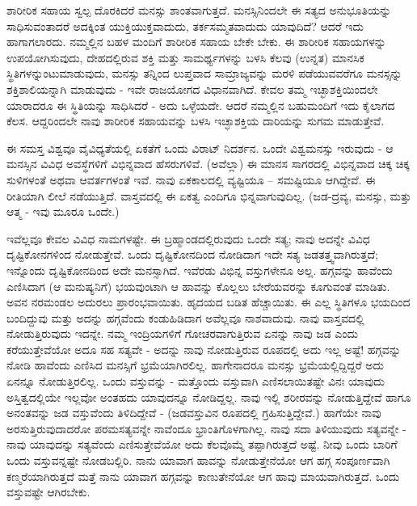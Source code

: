 ಶಾರೀರಿಕ ಸಹಾಯ ಸ್ವಲ್ಪ ದೊರಕಿದರೆ ಮನಸ್ಸು ಶಾಂತವಾಗುತ್ತದೆ. ಮನಸ್ಸಿನಿಂದಲೇ ಈ ಸತ್ಯದ ಅನುಭೂತಿಯನ್ನು ಸಾಧಿಸುವಂತಾದರೆ ಅದಕ್ಕಿಂತ ಯುಕ್ತಿಯುಕ್ತವಾದುದು, ತರ್ಕಸಮ್ಮತವಾದುದು ಯಾವುದಿದೆ? ಆದರೆ ಇದು ಹಾಗಾಗಲಾರದು. ನಮ್ಮಲ್ಲಿನ ಬಹಳ ಮಂದಿಗೆ ಶಾರೀರಿಕ ಸಹಾಯ ಬೇಕೇ ಬೇಕು. ಈ ಶಾರೀರಿಕ ಸಹಾಯಗಳನ್ನು ಉಪಯೋಗಿಸುವುದು, ದೇಹದಲ್ಲಿರುವ ಶಕ್ತಿ ಮತ್ತು ಸಾಮರ್ಥ್ಯಗಳನ್ನು ಬಳಸಿ ಕೆಲವು (ಉನ್ನತ) ಮಾನಸಿಕ ಸ್ಥಿತಿಗಳನ್ನುಂಟುಮಾಡುವುದು, ಮನಸ್ಸು ತನ್ನಿಂದ ಲುಪ್ತವಾದ ಸಾಮ್ರಾಜ್ಯವನ್ನು ಮರಳಿ ಪಡೆಯುವವರೆಗೂ ಮನಸ್ಸನ್ನು ಶಕ್ತಿಶಾಲಿಯನ್ನಾಗಿ ಮಾಡುವುದು - ಇವೇ ರಾಜಯೋಗದ ವಿಧಾನವಾಗಿದೆ. ಕೇವಲ ತಮ್ಮ ಇಚ್ಛಾಶಕ್ತಿಯಿಂದಲೇ ಯಾರಾದರೂ ಈ ಸ್ಥಿತಿಯನ್ನು ಸಾಧಿಸಿದರೆ - ಅದು ಒಳ್ಳೆಯದೇ. ಆದರೆ ನಮ್ಮಲ್ಲಿನ ಬಹುಮಂದಿಗೆ ಇದು ಕೈಲಾಗದ ಕೆಲಸ. ಆದ್ದರಿಂದಲೇ ನಾವು ಶಾರೀರಿಕ ಸಹಾಯವನ್ನು ಬಳಸಿ ಇಚ್ಛಾಶಕ್ತಿಯ ದಾರಿಯನ್ನು ಸುಗಮ ಮಾಡುತ್ತೇವೆ.

ಈ ಸಮಸ್ತ ವಿಶ್ವವೂ ವೈವಿಧ್ಯತೆಯಲ್ಲಿ ಏಕತೆಗೆ ಒಂದು ವಿರಾಟ್ ನಿದರ್ಶನ. ಒಂದೇ ವಿಶ್ವಮನಸ್ಸು ಇರುವುದು - ಆ ಮನಸ್ಸಿನ ವಿವಿಧ ಅವಸ್ಥೆಗಳಿಗೆ ವಿಭಿನ್ನವಾದ ಹೆಸರುಗಳಿವೆ. (ಅವೆಲ್ಲಾ) ಈ ಮಾನಸ ಸಾಗರದಲ್ಲಿ ವಿಭಿನ್ನವಾದ ಚಿಕ್ಕ ಚಿಕ್ಕ ಸುಳಿಗಳಂತೆ ಅಥವಾ ಆವರ್ತಗಳಂತೆ ಇವೆ. ನಾವು ಏಕಕಾಲದಲ್ಲಿ ವ್ಯಷ್ಟಿಯೂ – ಸಮಷ್ಟಿಯೂ ಆಗಿದ್ದೇವೆ. ಈ ರೀತಿಯಾಗಿ ಲೀಲೆ ನಡೆಯುತ್ತಿದೆ. ವಾಸ್ತವದಲ್ಲಿ ಈ ಏಕತ್ವ ಎಂದಿಗೂ ಭಿನ್ನವಾಗುವುದಿಲ್ಲ. (ಜಡ-ದ್ರವ್ಯ, ಮನಸ್ಸು, ಮತ್ತು ಆತ್ಮ - ಇವು ಮೂರೂ ಒಂದೇ.)

ಇವೆಲ್ಲವೂ ಕೇವಲ ವಿವಿಧ ನಾಮಗಳಷ್ಟೇ. ಈ ಬ್ರಹ್ಮಾಂಡದಲ್ಲಿರುವುದು ಒಂದೇ ಸತ್ಯ; ನಾವು ಅದನ್ನೇ ವಿವಿಧ ದೃಷ್ಟಿಕೋನಗಳಿಂದ ನೋಡುತ್ತೇವೆ. ಒಂದು ದೃಷ್ಟಿಕೋನದಿಂದ ನೋಡಿದಾಗ ಇದೇ ಸತ್ಯ ಜಡತತ್ತ್ವವಾಗಿರುತ್ತದೆ; ಇನ್ನೊಂದು ದೃಷ್ಟಿಕೋನದಿಂದ ಅದೇ ಮನಸ್ಸಾಗಿದೆ. ಇವೆರಡು ವಿಭಿನ್ನ ವಸ್ತುಗಳೇನೂ ಅಲ್ಲ. ಹಗ್ಗವನ್ನು ಹಾವೆಂದು ಎಣಿಸಿದಾಗ (ಆ ಮನುಷ್ಯನಿಗೆ) ಭಯವುಂಟಾಗಿ ಆ ಹಾವನ್ನು ಕೊಲ್ಲಲು ಬೇರೆಯವರನ್ನು ಕೂಗುವಂತೆ ಮಾಡಿತು. ಅವನ ನರಮಂಡಲ ಅದುರಲು ಪ್ರಾರಂಭವಾಯಿತು. ಹೃದಯದ ಬಡಿತ ಹೆಚ್ಚಾಯಿತು. ಈ ಎಲ್ಲ ಸ್ಥಿತಿಗಳೂ ಭಯದಿಂದ ಬಂದಿದ್ದುವು ಮತ್ತು ಅದನ್ನು ಹಗ್ಗವೆಂದು ಕಂಡುಹಿಡಿದಾಗ ಅವೆಲ್ಲವೂ ನಾಶವಾದುವು. ನಾವು ವಾಸ್ತವದಲ್ಲಿ ನೋಡುತ್ತಿರುವುದು ಇದನ್ನೇ. ನಮ್ಮ ಇಂದ್ರಿಯಗಳಿಗೆ ಗೋಚರವಾಗುತ್ತಿರುವ ಏನನ್ನು ನಾವು ಜಡ ಎಂದು ಕರೆಯುತ್ತೇವೆಯೋ ಅದೂ ಸಹ ಸತ್ಯವೇ - ಅದನ್ನು ನಾವು ನೋಡುತ್ತಿರುವ ರೂಪದಲ್ಲಿ ಅದು ಇಲ್ಲ ಅಷ್ಟೆ! ಹಗ್ಗವನ್ನು ನೋಡಿ ಹಾವೆಂದು ಎಣಿಸಿದ ಮನಸ್ಸಿಗೆ ಭ್ರಮೆಯಾಗಿರಲಿಲ್ಲ. ಹಾಗೇನಾದರೂ ಮನಸ್ಸು ಭ್ರಮೆಯಲ್ಲಿದ್ದಿದ್ದರೆ ಅದು ಏನನ್ನೂ ನೋಡುತ್ತಿರಲಿಲ್ಲ. ಒಂದು ವಸ್ತುವನ್ನು - ಮತ್ತೊಂದು ವಸ್ತುವಾಗಿ ಎಣಿಸಲಾಯಿತಷ್ಟೇ ವಿನಃ ಯಾವುದು ಅಸ್ತಿತ್ವದಲ್ಲಿಯೇ ಇಲ್ಲವೋ ಅಂತಹದು ಯಾವುದನ್ನೂ ನೋಡಿದ್ದಲ್ಲ. ನಾವು ಇಲ್ಲಿ ಶರೀರವನ್ನು ನೋಡುತ್ತಿದ್ದೇವೆ ಹಾಗೂ ಅನಂತವನ್ನು ಜಡ ವಸ್ತುವೆಂದು ತಿಳಿದಿದ್ದೇವೆ - (ಜಡವಸ್ತುವಿನ ರೂಪದಲ್ಲಿ ಗ್ರಹಿಸುತ್ತಿದ್ದೇವೆ.) ಹಾಗೆಯೇ ನಾವು ಅರಸುತ್ತಿರುವುದಾದರೋ ಪರಮಸತ್ಯವನ್ನೇ ನಾವೆಂದೂ ಭ್ರಾಂತಿಗೊಳಗಾಗಿಲ್ಲ. ನಾವು ಸದಾ ತಿಳಿಯುವುದು ಸತ್ಯವನ್ನೇ - ನಾವು ಯಾವುದನ್ನು ಸತ್ಯವೆಂದು ಎಣಿಸುತ್ತೇವೆಯೋ ಅದು ಕೆಲವೊಮ್ಮೆ ತಪ್ಪಾಗಿರುತ್ತದೆ ಅಷ್ಟೆ. ನೀವು ಒಂದು ಬಾರಿಗೆ ಒಂದು ವಸ್ತುವನ್ನಷ್ಟೇ ನೋಡಬಲ್ಲಿರಿ. ನಾನು ಯಾವಾಗ ಹಾವನ್ನು ನೋಡುತ್ತೇನೆಯೋ ಆಗ ಹಗ್ಗ ಸಂಪೂರ್ಣವಾಗಿ ಕಣ್ಮರೆಯಾಗಿರುತ್ತದೆ ಮತ್ತೆ ನಾನು ಯಾವಾಗ ಹಗ್ಗವನ್ನು ಕಾಣುತೇನೆಯೋ ಆಗ ಹಾವು ಮಾಯವಾಗಿರುತ್ತದೆ. ಒಂದು ವಸ್ತುವಷ್ಟೇ ಆಗಿರಬೇಕು.

